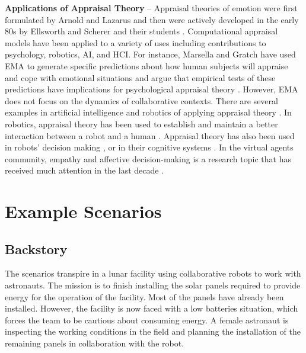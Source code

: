 \textbf{Applications of Appraisal Theory} -- Appraisal theories of emotion were
first formulated by Arnold \cite{arnold:emotion-personality} and Lazarus
\cite{lazarus:emotion-adaptation} and then were actively developed in the early
80s by Ellsworth and Scherer and their students
\cite{roseman:appraisal-theory,sander:systems-approach-appraisal,scherer:nature-function-emotion,scherer:emotions-emergent,scherer:appraisal-processes}.
Computational appraisal models have been applied to a variety of uses including
contributions to psychology, robotics, AI, and HCI. For instance, Marsella and
Gratch have used EMA \cite{marsella:ema-process-model} to generate specific
predictions about how human subjects will appraise and cope with emotional
situations and argue that empirical tests of these predictions have implications
for psychological appraisal theory \cite{gratch:assessing-appraisal}. However,
EMA does not focus on the dynamics of collaborative contexts. There are several
examples in artificial intelligence and robotics of applying appraisal theory
\cite{adam:bdi-emotional-companion,kim:model-hri-appraisal,marsella:ema-process-model}.
In robotics, appraisal theory has been used to establish and maintain a better
interaction between a robot and a human
\cite{kim:model-hri-appraisal,sander:systems-approach-appraisal,vogiatzis:robot-museum}.
Appraisal theory has also been used in robots' decision making
\cite{castro:autonomous-robot-fear}, or in their cognitive systems
\cite{hudlicka:emotinos-reasons,marinier:emotion-reinforcement}. In the virtual
agents community, empathy and affective decision-making is a research topic that
has received much attention in the last decade
\cite{scott:modeling-empathy-agent,paiva:agent-care,pontier:women-robot-men,velasquez:emotions-motivations-agents}.

\section{Example Scenarios}
\label{sec:example-scenario}

\subsection{Backstory}

The scenarios transpire in a lunar facility using collaborative robots to work
with astronauts. The mission is to finish installing the solar panels required
to provide energy for the operation of the facility. Most of the panels have
already been installed. However, the facility is now faced with a low batteries
situation, which forces the team to be cautious about consuming energy. A female
astronaut is inspecting the working conditions in the field and planning the
installation of the remaining panels in collaboration with the robot.

